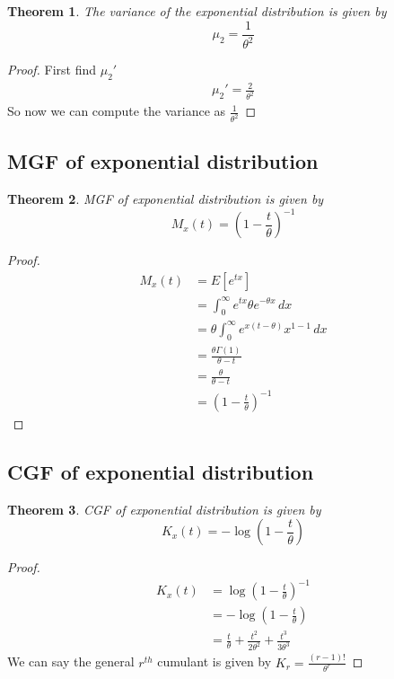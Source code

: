 \documentclass[oneside,11pt,pdftex]{book}%
\numberwithin{equation}{section}
\newtheorem{theorem}{Theorem}[chapter]%
\numberwithin{section}{chapter}
\numberwithin{equation}{chapter}
\begin{document}
\begin{theorem}
	The variance of the exponential distribution is given by \[ \mu_2 = \frac{1}{\theta^2}\]
\end{theorem}
\begin{proof}
	First find $ \mu_2' $
	\begin{align*}
		\mu_2'=\frac{2}{\theta^2}
	\end{align*}
So now we can compute the variance as $ \frac{1}{\theta^2} $
\end{proof}

\subsection{MGF of exponential distribution}
\begin{theorem}
	MGF of exponential distribution is given by \[ M_x(t)= \left(1- \frac{t}{\theta}\right)^{-1} \]
\end{theorem}
\begin{proof}
	\begin{align*}
		M_x(t)&=E[e^{tx}]\\
		&=\int_0^\infty e^{tx} \theta e^{-\theta x}\, dx\\
		&=\theta \int_0^\infty e^{x(t-\theta)} x^{1-1}\, dx\\
		&= \frac{\theta \Gamma(1)}{\theta - t}\\
		&=\frac{\theta }{\theta-t}\\
		&= \left(1- \frac{t}{\theta}\right)^{-1}
	\end{align*}
\end{proof}

\subsection{CGF of exponential distribution}
\begin{theorem}
	CGF of exponential distribution is given by \[ K_x(t)=-\log\left(1- \frac{t}{\theta}\right) \]
\end{theorem}
\begin{proof}
	\begin{align*}
		K_x(t)&= \log \left(1-\frac{t}{\theta}\right)^{-1}\\
		&= -\log\left(1- \frac{t}{\theta}\right)\\
		&= \frac{t}{\theta }+\frac{t^2}{2 \theta^2}+\frac{t^3}{3 \theta^3}
	\end{align*}
We can say the general $ r^{th} $ cumulant is given by $ K_r=\frac{(r-1)!}{\theta^r} $
\end{proof}
\end{document}
